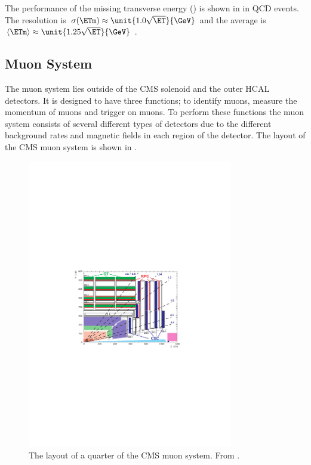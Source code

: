 The performance of the missing transverse energy (\ETm) is shown in
 in QCD events. The \ETm resolution is
$\sigma(\ETm) \approx \unit{1.0 \sqrt \ET}{\GeV}$ and the average \ETm is
$\langle \ETm \rangle \approx \unit{1.25 \sqrt \ET}{\GeV}$
\cite{chatrchyan2008cms}.

\subsection{Muon System}
The muon system lies outside of the CMS solenoid and the outer HCAL detectors.
It is designed to have three functions; to identify muons, measure the momentum
of muons and trigger on muons. To perform these functions the muon system
consists of several different types of detectors due to the different background
rates and magnetic fields in each region of the detector.
The layout of the {CMS} muon system is shown in .

\begin{figure}[htbp]
  \centering
  \includegraphics[width=0.8\textwidth]{muon_system}
  \caption[The layout of a quarter of the CMS muon system.] {The layout of a
quarter of the CMS muon system. From \cite{chatrchyan2008cms}.}
  \label{fig:muon_system}
\end{figure}

